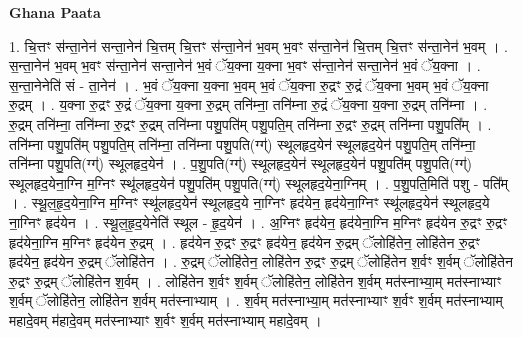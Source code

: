 \documentclass[17pt]{extarticle}
\begin{document}
\textbf{Ghana Paata } \newline

1. चि॒त्तꣳ स॑न्ता॒नेन॑ सन्ता॒नेन॑ चि॒त्तम् चि॒त्तꣳ स॑न्ता॒नेन॑ भ॒वम् भ॒वꣳ स॑न्ता॒नेन॑ चि॒त्तम् चि॒त्तꣳ स॑न्ता॒नेन॑ भ॒वम् । . स॒न्ता॒नेन॑ भ॒वम् भ॒वꣳ स॑न्ता॒नेन॑ सन्ता॒नेन॑ भ॒वं ॅय॒क्ना य॒क्ना भ॒वꣳ स॑न्ता॒नेन॑ सन्ता॒नेन॑ भ॒वं ॅय॒क्ना । . स॒न्ता॒नेनेति॑ सं - ता॒नेन॑ । . भ॒वं ॅय॒क्ना य॒क्ना भ॒वम् भ॒वं ॅय॒क्ना रु॒द्रꣳ रु॒द्रं ॅय॒क्ना भ॒वम् भ॒वं ॅय॒क्ना रु॒द्रम् । . य॒क्ना रु॒द्रꣳ रु॒द्रं ॅय॒क्ना य॒क्ना रु॒द्रम् तनि॑म्ना॒ तनि॑म्ना रु॒द्रं ॅय॒क्ना य॒क्ना रु॒द्रम् तनि॑म्ना । . रु॒द्रम् तनि॑म्ना॒ तनि॑म्ना रु॒द्रꣳ रु॒द्रम् तनि॑म्ना पशु॒पति॑म् पशु॒पति॒म् तनि॑म्ना रु॒द्रꣳ रु॒द्रम् तनि॑म्ना पशु॒पति᳚म् । . तनि॑म्ना पशु॒पति॑म् पशु॒पति॒म् तनि॑म्ना॒ तनि॑म्ना पशु॒पति(ग्ग्॑) स्थूलहृद॒येन॑ स्थूलहृद॒येन॑ पशु॒पति॒म् तनि॑म्ना॒ तनि॑म्ना पशु॒पति(ग्ग्॑) स्थूलहृद॒येन॑ । . प॒शु॒पति(ग्ग्॑) स्थूलहृद॒येन॑ स्थूलहृद॒येन॑ पशु॒पति॑म् पशु॒पति(ग्ग्॑) स्थूलहृद॒येना॒ग्नि म॒ग्निꣳ स्थू॑लहृद॒येन॑ पशु॒पति॑म् पशु॒पति(ग्ग्॑) स्थूलहृद॒येना॒ग्निम् । . प॒शु॒पति॒मिति॑ पशु - पति᳚म् । . स्थू॒ल॒हृ॒द॒येना॒ग्नि म॒ग्निꣳ स्थू॑लहृद॒येन॑ स्थूलहृद॒ये ना॒ग्निꣳ हृद॑येन॒ हृद॑येना॒ग्निꣳ स्थू॑लहृद॒येन॑ स्थूलहृद॒ये ना॒ग्निꣳ हृद॑येन । . स्थू॒ल॒हृ॒द॒येनेति॑ स्थूल - हृ॒द॒येन॑ । . अ॒ग्निꣳ हृद॑येन॒ हृद॑येना॒ग्नि म॒ग्निꣳ हृद॑येन रु॒द्रꣳ रु॒द्रꣳ हृद॑येना॒ग्नि म॒ग्निꣳ हृद॑येन रु॒द्रम् । . हृद॑येन रु॒द्रꣳ रु॒द्रꣳ हृद॑येन॒ हृद॑येन रु॒द्रम् ॅलोहि॑तेन॒ लोहि॑तेन रु॒द्रꣳ हृद॑येन॒ हृद॑येन रु॒द्रम् ॅलोहि॑तेन । . रु॒द्रम् ॅलोहि॑तेन॒ लोहि॑तेन रु॒द्रꣳ रु॒द्रम् ॅलोहि॑तेन श॒र्वꣳ श॒र्वम् ॅलोहि॑तेन रु॒द्रꣳ रु॒द्रम् ॅलोहि॑तेन श॒र्वम् । . लोहि॑तेन श॒र्वꣳ श॒र्वम् ॅलोहि॑तेन॒ लोहि॑तेन श॒र्वम् मत॑स्नाभ्या॒म् मत॑स्नाभ्याꣳ श॒र्वम् ॅलोहि॑तेन॒ लोहि॑तेन श॒र्वम् मत॑स्नाभ्याम् । . श॒र्वम् मत॑स्नाभ्या॒म् मत॑स्नाभ्याꣳ श॒र्वꣳ श॒र्वम् मत॑स्नाभ्याम् महादे॒वम् म॑हादे॒वम् मत॑स्नाभ्याꣳ श॒र्वꣳ श॒र्वम् मत॑स्नाभ्याम् महादे॒वम् । \newline
\end{document}
